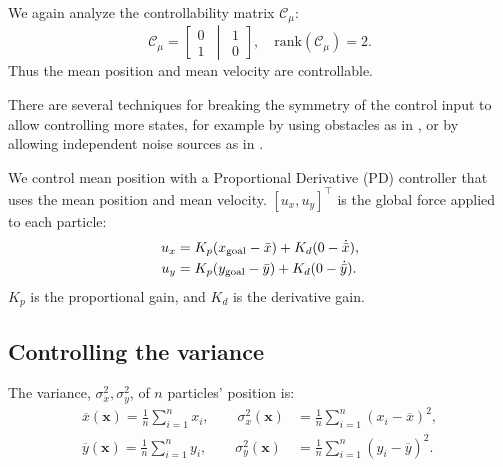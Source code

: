We again analyze the controllability matrix $\mathcal{C}_{\mu}$:
\begin{equation}
\mathcal{C}_\mu=\left[ \begin{matrix} 
0\\
1
\end{matrix}
\,\middle\vert\,
 \begin{matrix} 
1\\
0
\end{matrix}
 \right],  \quad \textrm{rank}(\mathcal{C}_\mu)=2.
\end{equation}
Thus the mean position and mean velocity are controllable.


There are several techniques for breaking the symmetry of the control input to allow controlling more states, for example by using obstacles as in \cite{Becker2013b}, or by allowing independent noise sources as in \cite{beckerIJRR2014}.

We control mean position with a Proportional Derivative (PD) controller that uses the mean position and mean velocity. $[u_x,u_y]^\top$ is the global force applied to each particle:
\begin{align}
u_x &= K_{p}(x_{\rm{goal}} - \bar{x}) + K_{d}(0-\dot{\bar{x}}), \nonumber\\
u_y &= K_{p}(y_{\rm{goal}}  - \bar{y}) + K_{d}(0-\dot{\bar{y}}).  \label{eq:PDcontrolPosition}
\end{align}
 $K_{p}$ is the proportional gain, and $K_{d}$ is the derivative gain. 


\subsection{Controlling the variance}\label{sec:VarianceControl}

The variance, $\sigma_x^2,\sigma_y^2$, of $n$ particles' position is:
\begin{align}\label{eq:meanVar}
 \overline{x}(\mathbf{x}) = \frac{1}{n} \sum_{i=1}^n x_{i}, \qquad  %
\sigma_x^2(\mathbf{x}) &= \frac{1}{n} \sum_{i=1}^n (x_{i} - \overline{x})^2,  \nonumber \\ 
 \overline{y}(\mathbf{x}) = \frac{1}{n} \sum_{i=1}^n y_{i}, \qquad  %
\sigma_y^2(\mathbf{x}) &= \frac{1}{n} \sum_{i=1}^n (y_{i} - \overline{y})^2.  
\end{align}

